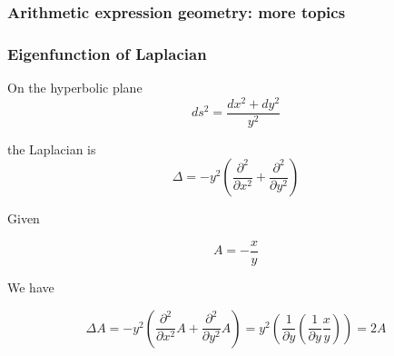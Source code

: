 \documentclass[aspectratio=169]{beamer}
\begin{document}
\begin{frame}
\frametitle{Arithmetic expression geometry: more topics}
\begin{figure}[ht]\centering
{}
\end{figure}
\end{frame}

\begin{frame}
\frametitle{Eigenfunction of Laplacian}

On the hyperbolic plane
\[
ds^2 = \frac{dx^2 + dy^2}{y^2}
\]

the Laplacian is
\[
\Delta = - y^2 (\frac{\partial^2}{\partial x^2} + \frac{\partial^2}{\partial y^2})
\]

Given

\begin{equation}
A = - \frac{x}{y}
\end{equation}

We have

$$
\Delta A = - y^2 (\frac{\partial^2}{\partial x^2} A + \frac{\partial^2}{\partial y^2} A) = y^2 (\frac{1}{\partial y} (\frac{1}{\partial y} \frac{x}{y})) = 2 A
$$

\end{frame}
\end{document}
